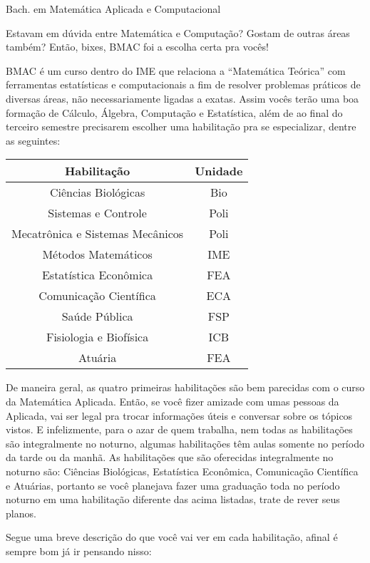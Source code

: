 \begin{subsecao}{Bach. em Matemática Aplicada e Computacional}

Estavam em dúvida entre Matemática e Computação? Gostam de outras áreas também?
Então, bixes, BMAC foi a escolha certa pra vocês!

BMAC é um curso dentro do IME que relaciona a ``Matemática Teórica'' com
ferramentas estatísticas e computacionais a fim de resolver problemas práticos
de diversas áreas, não necessariamente ligadas a exatas. Assim vocês terão uma
boa formação de Cálculo, Álgebra, Computação e Estatística, além de ao final do
terceiro semestre precisarem escolher uma habilitação pra se especializar, dentre as seguintes:

\begin {center}
  \begin {tabular}{|c|c|}
    \hline
    Habilitação & Unidade \\
    \hline
    Ciências Biológicas & Bio\\
    Sistemas e Controle & Poli\\
    Mecatrônica e Sistemas Mecânicos & Poli\\
    Métodos Matemáticos & IME\\
    Estatística Econômica & FEA \\
    Comunicação Científica & ECA \\
    Saúde Pública & FSP \\
    Fisiologia e Biofísica & ICB \\
    Atuária & FEA \\
    \hline
  \end {tabular}
\end {center}

De maneira geral, as quatro primeiras habilitações são bem parecidas com o
curso da Matemática Aplicada. Então, se você fizer amizade com umas pessoas da
Aplicada, vai ser legal pra trocar informações úteis e conversar sobre os tópicos
vistos. E infelizmente, para o azar de quem trabalha, nem todas as habilitações
são integralmente no noturno, algumas habilitações têm aulas somente no período da 
tarde ou da manhã. As habilitações que são oferecidas integralmente no noturno são: 
Ciências Biológicas, Estatística Econômica, Comunicação Científica e Atuárias, portanto 
se você planejava fazer uma graduação toda no período noturno em uma habilitação diferente
das acima listadas, trate de rever seus planos.

Segue uma breve descrição do que você vai ver em cada habilitação, afinal é sempre bom já ir pensando nisso:


\end{subsecao}
